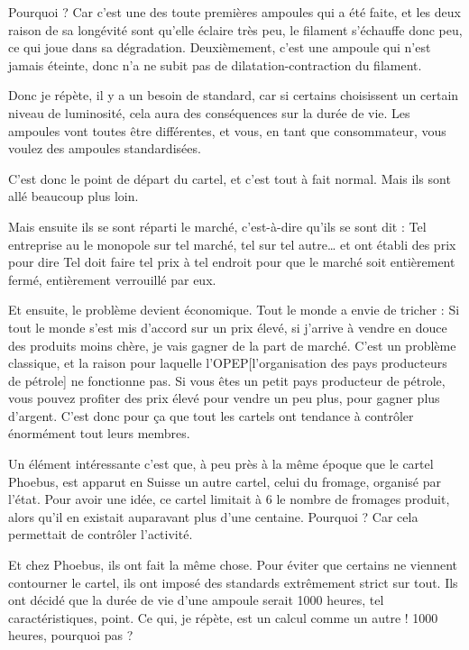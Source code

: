 \begin{small}
Pourquoi ? Car c'est une des toute premières ampoules qui a été faite, et les deux raison de sa longévité sont qu'elle éclaire très peu, le filament s'échauffe donc peu, ce qui joue dans sa dégradation. Deuxièmement, c'est une ampoule qui n'est jamais éteinte, donc n'a ne subit pas de dilatation-contraction du filament.

Donc je répète, il y a un besoin de standard, car si certains choisissent un certain niveau de luminosité, cela aura des conséquences sur la durée de vie.
Les ampoules vont toutes être différentes, et vous, en tant que consommateur, vous voulez des ampoules standardisées.

\medbreak

C'est  donc le point de départ du cartel, et c'est tout à fait normal. Mais ils sont allé beaucoup plus loin.

Mais ensuite ils se sont réparti le marché, c'est-à-dire qu'ils se sont dit : \og  
Tel entreprise au le monopole sur tel marché, tel sur tel autre\dots  \fg{} et ont établi des prix pour dire  \og Tel doit faire tel prix à tel endroit  \fg{} pour que le marché soit entièrement fermé, entièrement verrouillé par eux.

 Et ensuite, le problème devient économique. Tout le monde a envie de tricher : Si tout le monde s'est mis d'accord sur un prix élevé, si j'arrive à vendre en douce des produits moins chère, je vais gagner de la part de marché. C'est un problème classique, et la raison pour laquelle l'OPEP[l'organisation des pays producteurs de pétrole] ne fonctionne pas. Si vous êtes un petit pays producteur de pétrole, vous pouvez profiter des prix élevé pour vendre un peu plus, pour gagner plus d'argent.  C'est donc pour ça que tout les cartels ont tendance à contrôler énormément tout leurs membres.
 
\smallbreak 
 
Un élément intéressante c'est que, à peu près à la même époque que le cartel Phoebus, est apparut en Suisse un autre cartel, celui du fromage, organisé par l'état. Pour avoir une idée, ce cartel limitait à 6 le nombre de fromages produit, alors qu'il en existait auparavant plus d'une centaine. Pourquoi ? Car cela permettait de contrôler l'activité.

\smallbreak

Et chez Phoebus, ils ont fait la même chose. Pour éviter que certains ne viennent contourner le cartel, ils ont imposé des standards extrêmement strict sur tout.
Ils ont décidé que la durée de vie d'une ampoule serait 1000 heures, tel caractéristiques, point. Ce qui, je répète, est un calcul comme un autre ! 1000 heures, pourquoi pas ?


\end{small}

